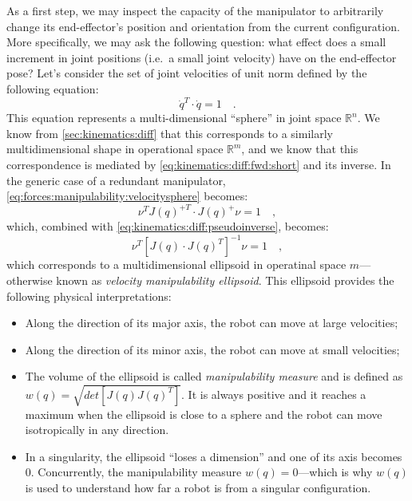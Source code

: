 As a first step, we may inspect the capacity of the manipulator to arbitrarily change its end-effector's position and orientation from the current configuration.
More specifically, we may ask the following question: what effect does a small increment in joint positions (i.e.\ a small joint velocity) have on the end-effector pose?
Let's consider the set of joint velocities of unit norm defined by the following equation:
\begin{equation}
\dot{q}^T\cdot\dot{q} = 1 \quad .  \label{eq:forces:manipulability:velocitysphere}
\end{equation}
This equation represents a multi-dimensional ``sphere'' in joint space $\mathbb{R}^n$.
We know from \cref{sec:kinematics:diff} that this corresponds to a similarly multidimensional shape in operational space $\mathbb{R}^m$, and we know that this correspondence is mediated by \cref{eq:kinematics:diff:fwd:short} and its inverse. In the generic case of a redundant manipulator, \cref{eq:forces:manipulability:velocitysphere} becomes:
\begin{equation}
\nu^T J(q)^{+T} \cdot J(q)^+ \nu = 1 \quad ,
\end{equation}
which, combined with \cref{eq:kinematics:diff:pseudoinverse}, becomes:
\begin{equation}
\nu^T \left[ J(q) \cdot J(q)^T \right]^{-1} \nu = 1 \quad ,
\label{eq:forces:manipulability:velocitymanipulability}
\end{equation}
which corresponds to a multidimensional ellipsoid in operatinal space $m$---otherwise known as \textsl{velocity manipulability ellipsoid}. This ellipsoid provides the following physical interpretations:

\begin{itemize}
\item Along the direction of its major axis, the robot can move at large velocities;
\item Along the direction of its minor axis, the robot can move at small velocities;
\item The volume of the ellipsoid is called \textsl{manipulability measure} and is defined as $w(q)=\sqrt{det\left[ J(q)J(q)^T \right]}$. It is always positive and it reaches a maximum when the ellipsoid is close to a sphere and the robot can move isotropically in any direction.
\item In a singularity, the ellipsoid ``loses a dimension'' and one of its axis becomes 0. Concurrently, the manipulability measure $w(q)=0$---which is why $w(q)$ is used to understand how far a robot is from a singular configuration.
\end{itemize}

